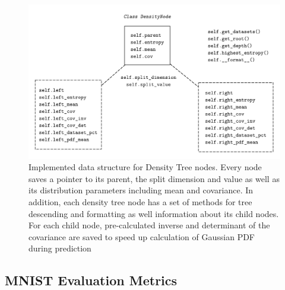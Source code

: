 \documentclass[10pt]{article}
\begin{document}
\begin{figure}[H]
    \centering
    \includegraphics[width=.7\textwidth]{Schema/density-node}
    \caption{Implemented data structure for Density Tree nodes. Every node saves a pointer to its parent, the split dimension and value as well as its distribution parameters including mean and covariance. In addition, each density tree node has a set of methods for tree descending and formatting as well information about its child nodes. For each child node, pre-calculated inverse and determinant of the covariance are saved to speed up calculation of Gaussian \gls{PDF} during prediction}
    \label{fig:density-node}
\end{figure}

\subsection{MNIST Evaluation Metrics}
\label{subsec:app-eval-mnist}
\end{document}

